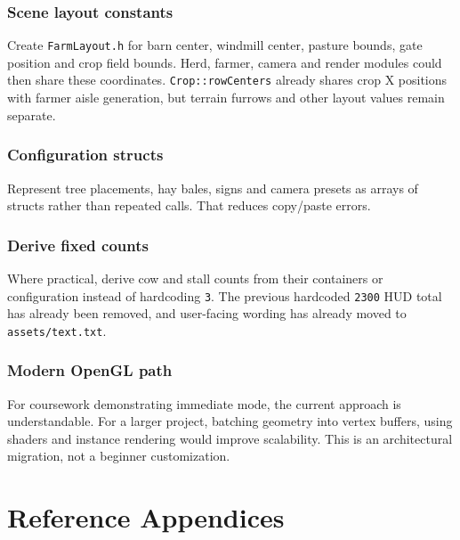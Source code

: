 \documentclass[11pt,a4paper,openany]{book}
\newcommand{\code}[1]{\texttt{#1}}
\newcommand{\file}[1]{\nolinkurl{#1}}
\begin{document}
\section{Scene layout constants}
Create \file{FarmLayout.h} for barn center, windmill center, pasture bounds, gate position and crop field bounds. Herd, farmer, camera and render modules could then share these coordinates. \code{Crop::rowCenters} already shares crop X positions with farmer aisle generation, but terrain furrows and other layout values remain separate.

\section{Configuration structs}
Represent tree placements, hay bales, signs and camera presets as arrays of structs rather than repeated calls. That reduces copy/paste errors.

\section{Derive fixed counts}
Where practical, derive cow and stall counts from their containers or configuration instead of hardcoding \code{3}. The previous hardcoded \code{2300} HUD total has already been removed, and user-facing wording has already moved to \file{assets/text.txt}.

\section{Modern OpenGL path}
For coursework demonstrating immediate mode, the current approach is understandable. For a larger project, batching geometry into vertex buffers, using shaders and instance rendering would improve scalability. This is an architectural migration, not a beginner customization.

\appendix
\part{Reference Appendices}
\end{document}
